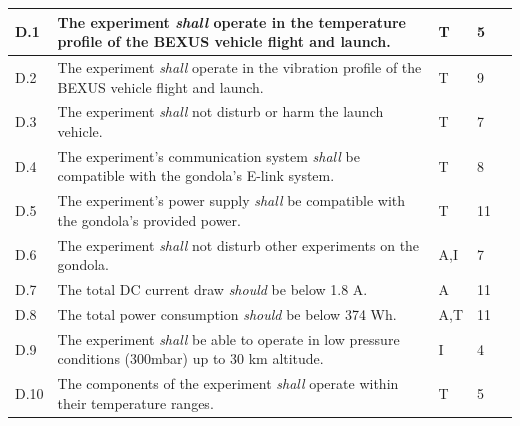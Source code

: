 \documentclass[a4paper,12pt,twoside]{article}
\begin{document}
\begin{longtable}[]{|m{}| m{} |m{} |m{}|m{}|}
D.1  & The experiment \textit{shall} operate in the temperature profile of the BEXUS vehicle flight and launch.                                                                         &       T       & 5            &        \\ \hline
D.2  & The experiment \textit{shall} operate in the vibration profile of the BEXUS vehicle flight and launch.                                                                           &       T       & 9            &        \\ \hline
D.3  & The experiment \textit{shall} not disturb or harm the launch vehicle.                                                                                                            &      T        & 7            &        \\ \hline
D.4  & The experiment's communication system \textit{shall} be compatible with the gondola's E-link system.                                                                             &      T        & 8            &        \\ \hline
D.5  & The experiment's power supply \textit{shall
} be compatible with the gondola's provided power.                                                                                    &      T        &  11           &        \\ \hline
D.6  & The experiment \textit{shall} not disturb other experiments on the gondola.                                                                                                      &       A,I       & 7            &        \\ \hline
D.7  & The total DC current draw \textit{should} be below 1.8 A.                                                                                                                        &      A        & 11            &        \\ \hline
D.8  & The total power consumption \textit{should} be below 374 Wh.                                                                                                                      &       A,T       & 11            &        \\ \hline
D.9  & The experiment \textit{shall} be able to operate in low pressure conditions (300mbar) up to 30 km altitude.                                                                                       &      I        &  4           &        \\ \hline
D.10 & The components of the experiment \textit{shall} operate within their temperature ranges.                                                                                         &       T       & 5            &        \\  \hline

\end{longtable}
\end{document}
